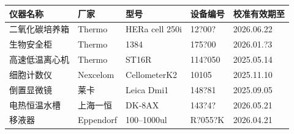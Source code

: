 \documentclass[UTF8,10pt,a4paper,fontset=fandol]{ctexart}
\newcommand{\fieldvalue}[1]{#1}
\newcommand{\handwritten}[1]{#1}
\begin{document}
\begin{center}
\begin{center}
\begin{tabularx}{\textwidth}{|X|X|X|X|X|}
\hline
仪器名称 & 厂家 & 型号 & 设备编号 & 校准有效期至\\
\hline
二氧化碳培养箱 & Thermo & HERa cell 250i &
\fieldvalue{\handwritten{12?00?}} &
\fieldvalue{\handwritten{2026.06.22}}\\
\hline
生物安全柜 & Thermo & 1384 &
\fieldvalue{\handwritten{175?00}} &
\fieldvalue{\handwritten{2026.01.?3}}\\
\hline
高速低温离心机 & Thermo & ST16R &
\fieldvalue{\handwritten{114?050}} &
\fieldvalue{\handwritten{2025.05.14}}\\
\hline
细胞计数仪 & Nexcelom & CellometerK2 &
\fieldvalue{\handwritten{10105}} &
\fieldvalue{\handwritten{2025.11.10}}\\
\hline
倒置显微镜 & 莱卡 & Leica Dmi1 &
\fieldvalue{\handwritten{148?81}} &
\fieldvalue{\handwritten{2025.09.05}}\\
\hline
电热恒温水槽 & 上海一恒 & DK-8AX &
\fieldvalue{\handwritten{143?4?}} &
\fieldvalue{\handwritten{2026.05.21}}\\
\hline
移液器 & Eppendorf &
\fieldvalue{\handwritten{100--1000ul}} &
\fieldvalue{\handwritten{R?055?K}} &
\fieldvalue{\handwritten{2026.04.21}}\\
\hline
\end{tabularx}


\end{center}
\end{center}
\end{document}
